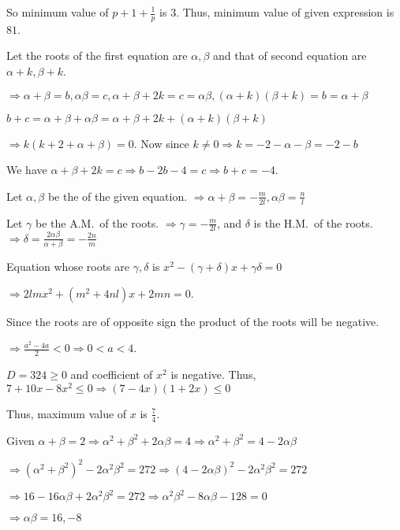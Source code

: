   So minimum value of $p + 1 + \frac{1}{p}$ is $3$. Thus, minimum value of given expression is $81$.
\item Let the roots of the first equation are $\alpha, \beta$ and that of second equation are $\alpha +
  k, \beta + k$.

  $\Rightarrow \alpha + \beta = b, \alpha\beta = c, \alpha + \beta + 2k = c = \alpha\beta, (\alpha +
  k)(\beta + k) = b = \alpha + \beta$

  $b + c = \alpha + \beta + \alpha\beta = \alpha + \beta + 2k + (\alpha + k)(\beta + k)$

  $\Rightarrow k(k + 2 + \alpha + \beta) = 0$. Now since $k\neq 0 \Rightarrow k = -2 - \alpha - \beta = -2 -
  b$

  We have $\alpha + \beta + 2k = c \Rightarrow b - 2b - 4 = c \Rightarrow b + c = -4$.
\item Let $\alpha, \beta$ be the of the given equation. $\Rightarrow \alpha + \beta =
  -\frac{m}{2l}, \alpha\beta = \frac{n}{l}$

  Let $\gamma$ be the A.M.\ of the roots. $\Rightarrow \gamma = -\frac{m}{2l}$, and $\delta$ is the H.M.\ of
  the roots. $\Rightarrow \delta = \frac{2\alpha\beta}{\alpha + \beta} = -\frac{2n}{m}$

  Equation whose roots are $\gamma, \delta$ is $x^2 - \left(\gamma + \delta\right)x + \gamma\delta = 0$

  $\Rightarrow 2lmx^2 + \left(m^2 + 4nl\right)x + 2mn = 0$.
\item Since the roots are of opposite sign the product of the roots will be negative.

  $\Rightarrow \frac{a^2 - 4a}{2} < 0 \Rightarrow 0 < a < 4$.
\item $D = 324 \geq 0$ and coefficient of $x^2$ is negative. Thus, $7 + 10x - 8x^2 \leq 0\Rightarrow (7 -
  4x)(1 + 2x)\leq 0$

  Thus, maximum value of $x$ is $\frac{7}{4}$.
\item Given $\alpha + \beta = 2\Rightarrow \alpha^2 + \beta^2 + 2\alpha\beta = 4\Rightarrow \alpha^2
  + \beta^2 = 4 - 2\alpha\beta$

  $\Rightarrow \left(\alpha^2 + \beta^2\right)^2 - 2\alpha^2\beta^2 = 272 \Rightarrow \left(4 -
  2\alpha\beta\right)^2 - 2\alpha^2\beta^2 = 272$

  $\Rightarrow 16 - 16\alpha\beta + 2\alpha^2\beta^2 = 272 \Rightarrow \alpha^2\beta^2 - 8\alpha\beta - 128
  = 0$

  $\Rightarrow \alpha\beta = 16, -8$


